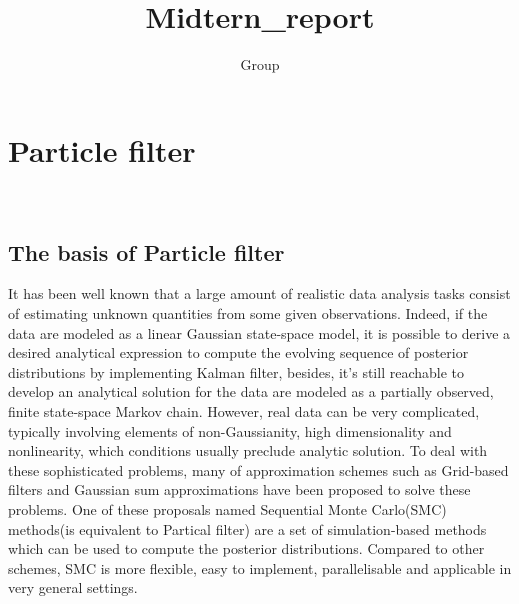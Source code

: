 \documentclass[11pt,oneside,a4paper]{article}
\author{Group}
\title{Midtern_report}
\begin{document}
\section{Particle filter}\\
\subsection{The basis of Particle filter}
It has been well known that a large amount of realistic data analysis tasks consist of estimating unknown quantities
from some given observations. Indeed, if the data are modeled as a linear Gaussian state-space model, it is possible
to derive a desired analytical expression to compute the evolving sequence of posterior distributions by implementing
Kalman filter, besides, it's still reachable to develop an analytical solution for the data are modeled as a partially
observed, finite state-space Markov chain. However, real data can be very complicated, typically involving elements of
non-Gaussianity, high dimensionality and nonlinearity, which conditions usually preclude analytic solution.
To deal with these sophisticated problems, many of approximation schemes such as Grid-based filters and Gaussian sum
approximations have been proposed to solve these problems.  One of these proposals named Sequential Monte Carlo(SMC)
methods(is equivalent to Partical filter) are a set of simulation-based methods which can be used to compute the posterior distributions.
Compared to other schemes, SMC is more flexible, easy to implement, parallelisable and applicable in very general
settings.\\
\end{document}
